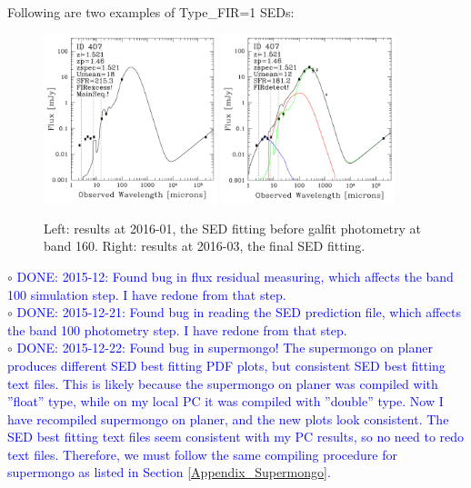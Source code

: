 \documentclass[11pt,a4paper]{article}
\begin{document}
Following are two examples of Type\_FIR=1 SEDs: 

\begin{figure}[H]
	\includegraphics[width=0.45\textwidth]{galsed_160_Plot_SED_407_v20160106}
	\includegraphics[width=0.45\textwidth]{galsed_160_Plot_SED_407_v20160309}
	\caption{Left: results at 2016-01, the SED fitting before galfit photometry at band 160. Right: results at 2016-03, the final SED fitting. }
\end{figure}

\indent\hspace{15pt}$\circ$ 
\textcolor{blue}{DONE: 2015-12: Found bug in flux residual measuring, which affects the band 100 simulation step. I have redone from that step.}
\\
\indent\hspace{15pt}$\circ$ 
\textcolor{blue}{DONE: 2015-12-21: Found bug in reading the SED prediction file, which affects the band 100 photometry step. I have redone from that step.}
\\
\indent\hspace{15pt}$\circ$ 
\textcolor{blue}{DONE: 2015-12-22: Found bug in supermongo! The supermongo on planer produces different SED best fitting PDF plots, but consistent SED best fitting text files. This is likely because the supermongo on planer was compiled with ''float'' type, while on my local PC it was compiled with ''double'' type. Now I have recompiled supermongo on planer, and the new plots look consistent. The SED best fitting text files seem consistent with my PC results, so no need to redo text files. Therefore, we must follow the same compiling procedure for supermongo as listed in Section \ref{Appendix_Supermongo}.}
\\
\end{document}
